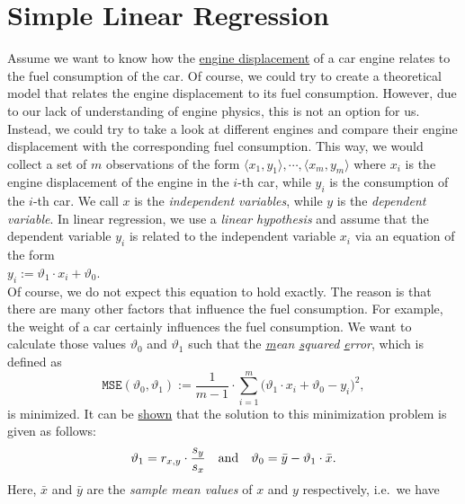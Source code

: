 \section{Simple Linear Regression}
Assume we want to know how the \href{https://en.wikipedia.org/wiki/Engine_displacement}{engine displacement} of
a car engine relates to the fuel consumption of the car.  Of course, we could try to create a theoretical model that
relates the engine displacement to its fuel consumption.  However, due to our lack of understanding of engine
physics, this is not an option for us.  Instead, we could try to take a look at different engines and compare
their engine displacement with the corresponding fuel consumption.  This way, we would collect a set of  
$m$ observations of the form $\langle x_1, y_1\rangle, \cdots, \langle x_m, y_m\rangle$ 
where $x_i$ is the engine displacement of the engine in the $i$-th car, while $y_i$ is the consumption of the
$i$-th car.  We call $x$ is the \emph{\color{blue}independent variables}, while $y$ is the 
\emph{\color{blue}dependent variable}.  In linear regression, we use a \emph{\color{blue}linear hypothesis} 
and assume that the dependent variable $y_i$ is related to the independent variable $x_i$ via an
equation of the form
\\[0.2cm]
\hspace*{1.3cm}
$y_i := \vartheta_1 \cdot x_i + \vartheta_0$.
\\[0.2cm]
Of course, we do not expect this equation to hold exactly.  The reason is that there are many other factors
that influence the fuel consumption.  For example, the weight of a car certainly influences the fuel
consumption.  We want to calculate those values $\vartheta_0$ and $\vartheta_1$ such that the
\emph{\color{blue}\underline{m}ean \underline{s}quared \underline{e}rror}, which is defined as 
\begin{equation}
  \label{eq:mse}
 \mathtt{MSE}(\vartheta_0, \vartheta_1) := \frac{1}{m-1} \cdot \sum\limits_{i=1}^m \bigl(\vartheta_1 \cdot x_i + \vartheta_0 - y_i\bigr)^2,
\end{equation}
is minimized.  It can be \href{https://en.wikipedia.org/wiki/Simple_linear_regression}{shown} that the solution
to this minimization problem is given as follows:
\begin{equation}
  \label{eq:theta0}
   \vartheta_1 = r_{x,y} \cdot \frac{s_y}{s_x} \quad \mbox{and} \quad \displaystyle\vartheta_0 = \bar{y} - \vartheta_1 \cdot \bar{x}.
\end{equation}
Here, $\bar{x}$ and $\bar{y}$ are the \emph{\color{blue}sample mean values} of $x$ and $y$ respectively, i.e.~we have

